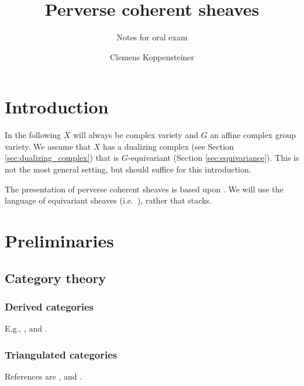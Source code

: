 \documentclass[english]{short-notes}
\title{Perverse coherent sheaves}
\subtitle{Notes for oral exam}
\author{Clemens Koppensteiner}
\begin{document}
\renewcommand\top{\mathrm{top}}
\renewcommand\dual{\mathbb D}

\maketitle

\tableofcontents

\section{Introduction}

In the following $X$ will always be complex variety and $G$ an affine complex group variety.
We assume that $X$ has a dualizing complex (see Section \ref{sec:dualizing_complex}) that is $G$-equivariant (Section \ref{sec:equivariance}).
This is not the most general setting, but should suffice for this introduction.

The presentation of perverse coherent sheaves is based upon \cite{Bezrukavnikov:arXiv:PerverseCoherentSheaves,ArinkinBezrukavnikov:arXiv:PerverseCoherentSheaves}.
We will use the language of equivariant sheaves (i.e.~\cite{Bezrukavnikov:arXiv:PerverseCoherentSheaves}), rather that stacks.

\section{Preliminaries}

\subsection{Category theory}

\subsubsection{Derived categories}\label{sec:derived_categories}

E.g., \cite{Verdier:1977:CategoriesDerivees}, \cite[Chapter~III]{GelfandManin:2003:MethodsOfHomologicalAlgebra} and \cite[Chapter 1]{Hartshorne:1966:ResiduesAndDuality}.

\subsubsection{Triangulated categories}\label{sec:triangulated_categories}

References are \cite{Verdier:1977:CategoriesDerivees}, \cite[Chapter IV]{GelfandManin:2003:MethodsOfHomologicalAlgebra} and \cite[Section 1.1]{BeilinsonBernsteinDeligne:1982:FaisceauxPervers}.
\end{document}

